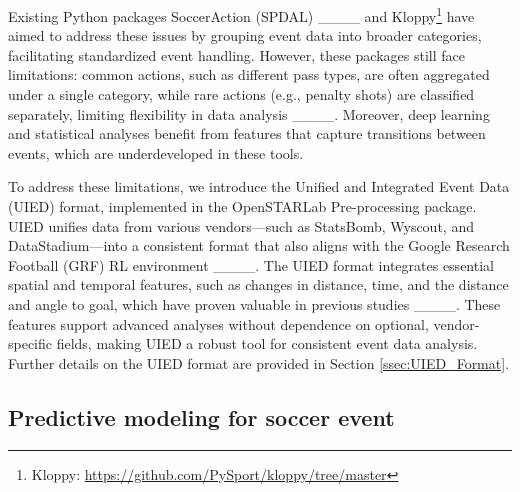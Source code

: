 Existing Python packages SoccerAction (SPDAL) ____ and Kloppy\footnote{Kloppy: \url{https://github.com/PySport/kloppy/tree/master}} have aimed to address these issues by grouping event data into broader categories, facilitating standardized event handling. However, these packages still face limitations: common actions, such as different pass types, are often aggregated under a single category, while rare actions (e.g., penalty shots) are classified separately, limiting flexibility in data analysis ____. Moreover, deep learning and statistical analyses benefit from features that capture transitions between events, which are underdeveloped in these tools.

To address these limitations, we introduce the Unified and Integrated Event Data (UIED) format, implemented in the OpenSTARLab Pre-processing package. UIED unifies data from various vendors—such as StatsBomb, Wyscout, and DataStadium—into a consistent format that also aligns with the Google Research Football (GRF) RL environment ____. The UIED format integrates essential spatial and temporal features, such as changes in distance, time, and the distance and angle to goal, which have proven valuable in previous studies ____. These features support advanced analyses without dependence on optional, vendor-specific fields, making UIED a robust tool for consistent event data analysis. Further details on the UIED format are provided in Section \ref{ssec:UIED_Format}.



\subsection{Predictive modeling for soccer event}
\label{ssec:predictive_modeling_for_soccer_event}

